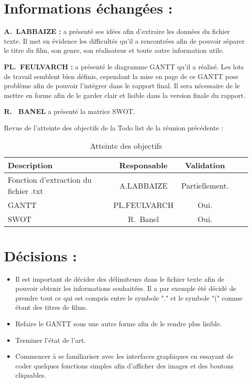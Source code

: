 \documentclass[11pt]{meetingmins}
\begin{document}
\section{Informations échangées :}
\begin{hiddenitems}
\item
\textbf{A.~LABBAIZE : } a présenté ses idées afin d'extraire les données du fichier texte. Il met en évidence les difficultés qu'il a rencontrées afin de pouvoir séparer le titre du film, son genre, son réalisateur et toute autre information utile.
\item
\textbf{PL.~FEULVARCH : }a présenté le diagramme GANTT qu'il a réalisé. Les lots de travail semblent bien définis, cependant la mise en page de ce GANTT pose problème afin de pouvoir l'intégrer dans le rapport final. Il sera nécessaire de le mettre en forme afin de le garder clair et lisible dans la version finale du rapport.
\item
\textbf{R. ~BANEL} a présenté la matrice SWOT.


\item Revue de l'atteinte des objectifs de la Todo list de la réunion précédente :
\begin{table}[h]
    \centering
    \begin{tabular}{|p{4cm}|c|c|c|c|}
    \hline
        \rowcolor{yellow} Description & Responsable & Validation
        \tabularnewline \hline
        Fonction d'extraction du fichier .txt &  A.LABBAIZE & Partiellement.
        \tabularnewline \hline
        GANTT & PL.FEULVARCH & Oui.
        \tabularnewline \hline
        SWOT  & R.~Banel & Oui. \tabularnewline \hline 

        
    \end{tabular}
    \caption{Atteinte des objectifs}
    \label{tab:my_label}
\end{table}

\end{hiddenitems}

\newpage

\section{Décisions :}
\begin{itemize}
    \item Il est important de décider des délimiteurs dans le fichier texte afin de pouvoir obtenir les informations souhaitées. Il a par exemple été décidé de prendre tout ce qui est compris entre le symbole "." et le symbole "(" comme étant des titres de films. 
    \item Refaire le GANTT sous une autre forme afin de le rendre plus lisible.
    \item Terminer l'état de l'art.
    \item Commencer à se familiariser avec les interfaces graphiques en essayant de coder quelques fonctions simples afin d'afficher des images et des boutons cliquables.
\end{itemize}
\end{document}
